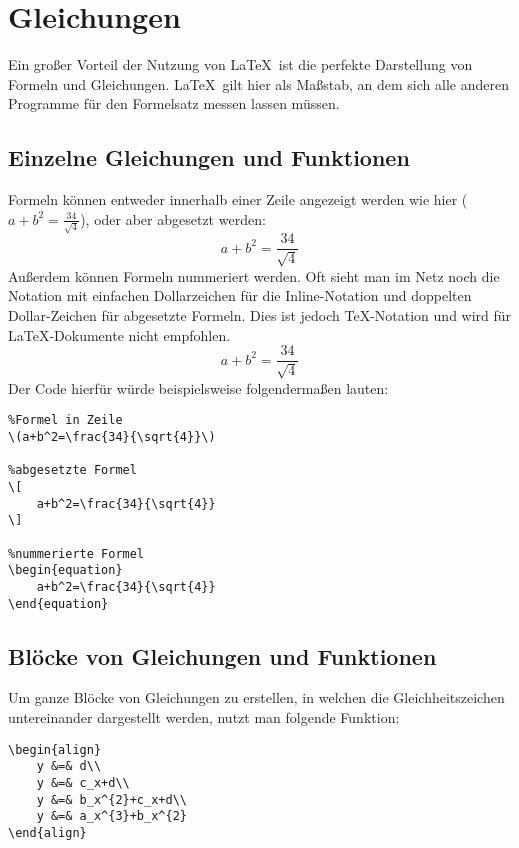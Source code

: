 
\chapter{Gleichungen}
Ein großer Vorteil der Nutzung von \LaTeX\ ist die perfekte Darstellung von Formeln und Gleichungen. 
\LaTeX\ gilt hier als Maßstab, an dem sich alle anderen Programme für den Formelsatz messen lassen müssen.

\section{Einzelne Gleichungen und Funktionen}
Formeln können entweder innerhalb einer Zeile angezeigt werden wie hier (\(a+b^2=\frac{34}{\sqrt{4}}\)), oder aber abgesetzt werden:
\[
    a+b^2=\frac{34}{\sqrt{4}}
\]
Außerdem können Formeln nummeriert werden. 
Oft sieht man im Netz noch die Notation mit einfachen Dollarzeichen für die Inline-Notation und doppelten Dollar-Zeichen für abgesetzte Formeln. 
Dies ist jedoch \TeX-Notation und wird für \LaTeX-Dokumente nicht empfohlen.
\begin{equation}
    a+b^2=\frac{34}{\sqrt{4}}
\end{equation}
Der Code hierfür würde beispielsweise folgendermaßen lauten:
\begin{lstlisting}
%Formel in Zeile
\(a+b^2=\frac{34}{\sqrt{4}}\)

%abgesetzte Formel
\[
    a+b^2=\frac{34}{\sqrt{4}}
\]

%nummerierte Formel
\begin{equation}
    a+b^2=\frac{34}{\sqrt{4}}
\end{equation}
\end{lstlisting}

\section{Blöcke von Gleichungen und Funktionen}

Um ganze Blöcke von Gleichungen zu erstellen, in welchen die Gleichheitszeichen untereinander dargestellt werden, nutzt man folgende Funktion:
\begin{lstlisting}
\begin{align}
    y &=& d\\
    y &=& c_x+d\\
    y &=& b_x^{2}+c_x+d\\
    y &=& a_x^{3}+b_x^{2}
\end{align}
\end{lstlisting}

